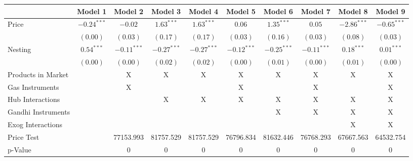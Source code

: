 
\begin{tabular}{l c c c c c c c c c}
\toprule
 & Model 1 & Model 2 & Model 3 & Model 4 & Model 5 & Model 6 & Model 7 & Model 8 & Model 9 \\
\midrule
Price                       & $-0.24^{***}$ & $-0.02$       & $1.63^{***}$  & $1.63^{***}$  & $0.06$        & $1.35^{***}$  & $0.05$        & $-2.86^{***}$ & $-0.65^{***}$ \\
                            & $(0.00)$      & $(0.03)$      & $(0.17)$      & $(0.17)$      & $(0.03)$      & $(0.16)$      & $(0.03)$      & $(0.08)$      & $(0.03)$      \\
Nesting                     & $0.54^{***}$  & $-0.11^{***}$ & $-0.27^{***}$ & $-0.27^{***}$ & $-0.12^{***}$ & $-0.25^{***}$ & $-0.11^{***}$ & $0.18^{***}$  & $0.01^{***}$  \\
                            & $(0.00)$      & $(0.00)$      & $(0.02)$      & $(0.02)$      & $(0.00)$      & $(0.01)$      & $(0.00)$      & $(0.01)$      & $(0.00)$      \\
\midrule
Products in Market          &               & X             & X             & X             & X             & X             & X             & X             & X             \\
Gas Instruments             &               & X             &               &               & X             &               & X             &               & X             \\
Hub Interactions            &               &               & X             & X             & X             & X             & X             & X             & X             \\
Gandhi Instruments          &               &               &               &               &               & X             & X             & X             & X             \\
Exog Interactions           &               &               &               &               &               &               &               & X             & X             \\
Price Test                  &               & 77153.993     & 81757.529     & 81757.529     & 76796.834     & 81632.446     & 76768.293     & 67667.563     & 64532.754     \\
p-Value                     &               & 0             & 0             & 0             & 0             & 0             & 0             & 0             & 0             \\

\end{tabular}
